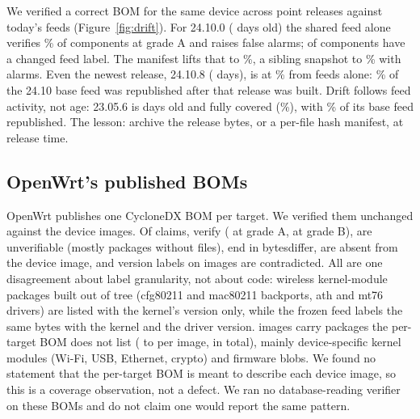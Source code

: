 \documentclass[sigconf,nonacm]{acmart}
\newcommand{\ubreak}{\textunderscore\allowbreak}
\newcommand{\vd}[1]{{\ttfamily\let\_\ubreak #1}}
\begin{document}
We verified a correct BOM for the same device across \driftReleases{} point releases against today's feeds (Figure~\ref{fig:drift}). For 24.10.0 (\driftOldTwentyFourAge{} days old) the shared feed alone verifies \driftOldTwentyFourFo\% of components at grade A and raises \driftOldTwentyFourFoAlarms{} false alarms; \driftOldTwentyFourRelabelled{} of \driftOldTwentyFourDeclared{} components have a changed feed label. The manifest lifts that to \driftOldTwentyFourMa\%, a sibling snapshot to \driftOldTwentyFourSn\% with \driftOldTwentyFourSnAlarms{} alarms. Even the newest release, 24.10.8 (\driftNewTwentyFourAge{} days), is at \driftNewTwentyFourFo\% from feeds alone: \republishedTwentyFourPct\% of the 24.10 base feed was republished after that release was built. Drift follows feed activity, not age: 23.05.6 is \driftNewTwentyThreeAge{} days old and fully covered (\driftNewTwentyThreeFo\%), with \republishedTwentyThreePct\% of its base feed republished. The lesson: archive the release bytes, or a per-file hash manifest, at release time.

\subsection{OpenWrt's published BOMs}

OpenWrt publishes one CycloneDX BOM per target. We verified them unchanged against the \obImages{} device images. Of \obClaims{} claims, \obVerified{} verify (\obVerA{} at grade A, \obVerB{} at grade B), \obUnverifiable{} are unverifiable (mostly packages without files), \obBytesDiffer{} end in \vd{bytes\_differ}, \obAbsent{} are absent from the device image, and \obWrongVersion{} version labels on \obWrongVersionImages{} images are contradicted. All \obWrongVersion{} are one disagreement about label granularity, not about code: wireless kernel-module packages built out of tree (cfg80211 and mac80211 backports, ath and mt76 drivers) are listed with the kernel's version only, while the frozen feed labels the same bytes with the kernel and the driver version. \obBeyondImages{} images carry packages the per-target BOM does not list (\obBeyondMin{} to \obBeyondMax{} per image, \obBeyondTotal{} in total), mainly device-specific kernel modules (Wi-Fi, USB, Ethernet, crypto) and firmware blobs. We found no statement that the per-target BOM is meant to describe each device image, so this is a coverage observation, not a defect. We ran no database-reading verifier on these BOMs and do not claim one would report the same pattern.
\end{document}
